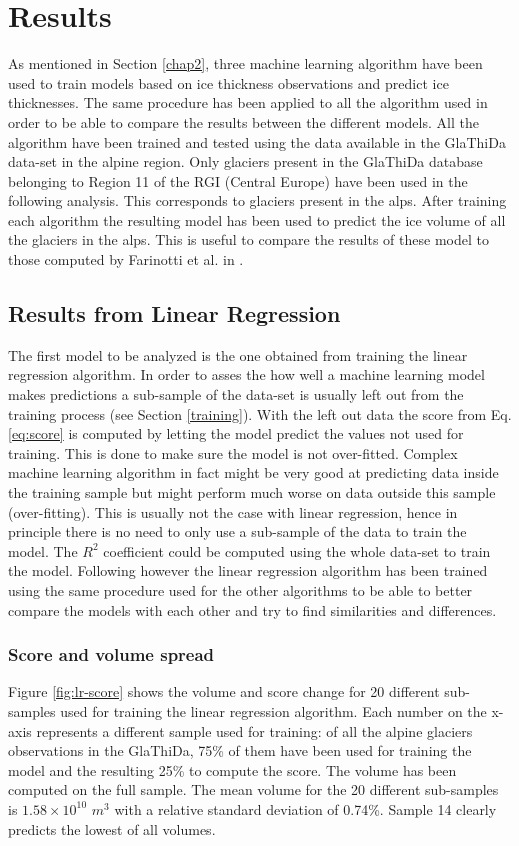 \chapter{Results}\label{chap3}
\thispagestyle{plain}

As mentioned in Section \ref{chap2}, three machine learning algorithm have been used to train models based on ice thickness observations and predict ice thicknesses. The same procedure has been applied to all the algorithm used in order to be able to compare the results between the different models. 
All the algorithm have been trained and tested using the data available in the GlaThiDa data-set in the alpine region. Only glaciers present in the GlaThiDa database belonging to Region 11 of the RGI (Central Europe) have been used in the following analysis. This corresponds to glaciers present in the alps. 
After training each algorithm the resulting model has been used to predict the ice volume of all the glaciers in the alps. This is useful to compare the results of these model to those computed by Farinotti et al. in \citet{Farinotti2019}.

\section{Results from Linear Regression}\label{linear}
The first model to be analyzed is the one obtained from training the linear regression algorithm. In order to asses the how well a machine learning model makes predictions a sub-sample of the data-set is usually left out from the training process (see Section \ref{training}). With the left out data the score from Eq. \ref{eq:score} is computed by letting the model predict the values not used for training. This is done to make sure the model is not over-fitted. Complex machine learning algorithm in fact might be very good at predicting data inside the training sample but might perform much worse on data outside this sample (over-fitting). 
This is usually not the case with linear regression, hence in principle there is no need to only use a sub-sample of the data to train the model. The $R^2$ coefficient could be computed using the whole data-set to train the model. Following however the linear regression algorithm has been trained using the same procedure used for the other algorithms to be able to better compare the models with each other and try to find similarities and differences.     

\subsection{Score and volume spread}\label{lr-score}
Figure \ref{fig:lr-score} shows the volume and score change  for 20 different sub-samples used for training the linear regression algorithm. Each number on the x-axis represents a different sample used for training: of all the alpine glaciers observations in the GlaThiDa, 75\% of them have been used for  training the model and the resulting 25\% to compute the score. The volume has been computed on the full sample. The mean volume for the 20 different sub-samples is $1.58\times 10^{10}$ $m^3$ with a relative standard deviation of 0.74\%. Sample 14 clearly predicts the lowest of all volumes.

